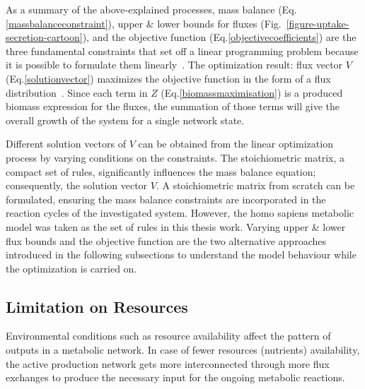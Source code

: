 

As a summary of the above-explained processes, mass balance (Eq.\eqref{massbalanceconstraint}), upper \& lower bounds for fluxes (Fig.~\ref{figure-uptake-secretion-cartoon}), and the objective function (Eq.\eqref{objectivecoefficients}) are the three fundamental constraints that set off a linear programming problem because it is possible to formulate them linearly~\cite{PRICE2004}. The optimization result: flux vector $V$ (Eq.\eqref{solutionvector}) maximizes the objective function in the form of a flux distribution~\cite{KAUFFMAN2003491,PRICE2004}. Since each term in $Z$ (Eq.\eqref{biomassmaximisation}) is a produced biomass expression for the fluxes, the summation of those terms will give the overall growth of the system for a single network state.

Different solution vectors of $V$ can be obtained from the linear optimization process by varying conditions on the constraints. The stoichiometric matrix, a compact set of rules, significantly influences the mass balance equation; consequently, the solution vector $V$. A stoichiometric matrix from scratch can be formulated, ensuring the mass balance constraints are incorporated in the reaction cycles of the investigated system. However, the homo sapiens metabolic model was taken as the set of rules in this thesis work. Varying upper \& lower flux bounds and the objective function are the two alternative approaches introduced in the following subsections to understand the model behaviour while the optimization is carried on.
\subsection*{Limitation on Resources}
%
Environmental conditions such as resource availability affect the pattern of outputs in a metabolic network. In case of fewer resources (nutrients) availability, the active production network gets more interconnected through more flux exchanges to produce the necessary input for the ongoing metabolic reactions.~\cite{PRICE2004,MAHADEVAN2003,Reed01092004,BURGARD2001}

